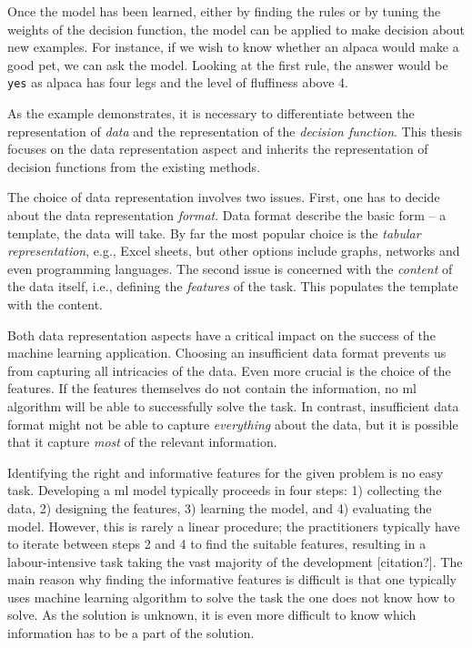 Once the model has been learned, either by finding the rules or by tuning the weights of the decision function, the model can be applied to make decision about new examples.
For instance, if we wish to know whether an alpaca would make a good pet, we can ask the model.
Looking at the first rule, the answer would be \texttt{yes} as alpaca has four legs and the level of fluffiness above 4.



As the example demonstrates, it is necessary to differentiate between the representation of \textit{data} and the representation of  the \textit{decision function}.
This thesis focuses on the data representation aspect and inherits the representation of decision functions from the existing methods.





The choice of data representation involves two issues.
First, one has to decide about the data representation \textit{format}.
Data format describe the basic form -- a template, the data will take.
By far the most popular choice is the \textit{tabular representation}, e.g., Excel sheets, but other options include graphs, networks and even programming languages.
The second issue is concerned with the \textit{content} of the data itself, i.e., defining the \textit{features} of the task.
This populates the template with the content.



Both data representation aspects have a critical impact on the success of the machine learning application.
Choosing an insufficient data format prevents us from capturing all intricacies of the data.
Even more crucial is the choice of the features.
If the features themselves do not contain the information, no \gls{ml} algorithm will be able to successfully solve the task.
In contrast, insufficient data format might not be able to capture \textit{everything} about the data, but it is possible that it capture \textit{most} of the relevant information.



Identifying the right and informative features for the given problem is no easy task.
Developing a \gls{ml} model typically proceeds in four steps: 1) collecting the data, 2) designing the features, 3) learning the model, and 4) evaluating the model.
However, this is rarely a linear procedure; the practitioners typically have to iterate between steps 2 and 4 to find the suitable features, resulting in a labour-intensive task taking the vast majority of the development [citation?].
The main reason why finding the informative features is difficult is that one typically uses machine learning algorithm to solve the task the one does not know how to solve.
As the solution is unknown, it is even more difficult to know which information has to be a part of the solution.


